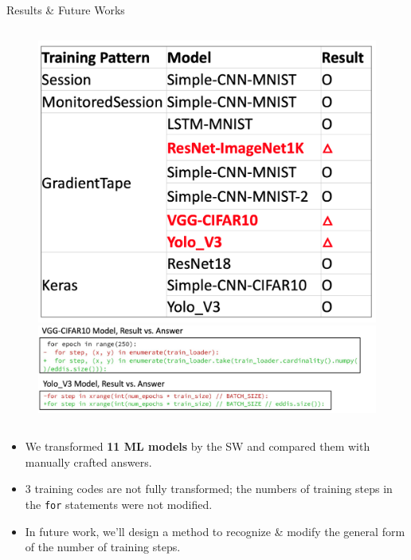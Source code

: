 \documentclass{beamer}
\begin{document}
\begin{frame}{Results \& Future Works}
  \begin{figure}
    \begin{columns}
        \includegraphics[width=1\textwidth]{results}
        \includegraphics[width=1\textwidth]{trainstep}
    \end{columns}
  \end{figure}

  {\small
  \begin{itemize}
    \item We transformed \textbf{11 ML models} by the SW
          and compared them with manually crafted answers.\\
    \item 3 training codes are not fully transformed; 
          the numbers of training steps
          in the {\tt for} statements were not modified.
    \item In future work, we'll design a method to recognize
    \& modify the general form of the number of training steps. 
  \end{itemize}
  }

\end{frame}
\end{document}
